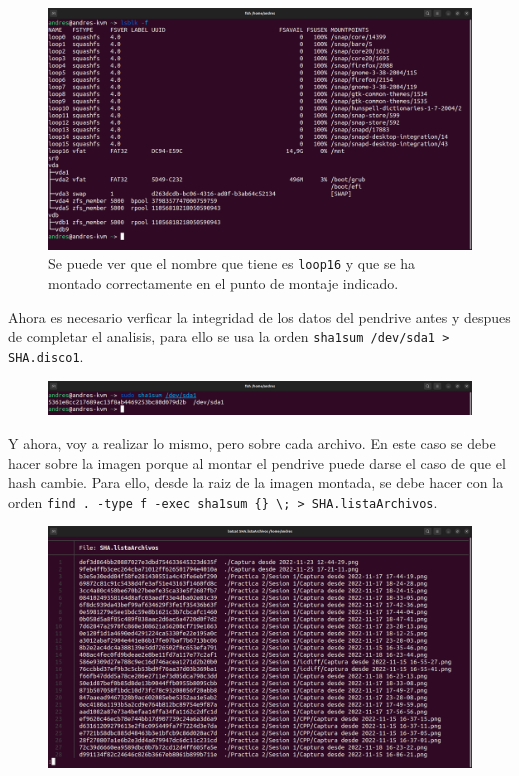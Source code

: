 \documentclass{article}
\begin{document}
\begin{figure}[H]
    \centering
    \includegraphics[width=\textwidth]{imagenes/Captura desde 2022-12-03 21-32-34.png}
    \caption{Se puede ver que el nombre que tiene es \texttt{loop16} y que se ha montado correctamente en el punto de montaje indicado.}
\end{figure}

Ahora es necesario verficar la integridad de los datos del pendrive antes y despues de completar el analisis, para ello se usa la orden \verb|sha1sum /dev/sda1 > SHA.disco1|.

\begin{figure}[H]
    \centering
    \includegraphics[width=\textwidth]{imagenes/Captura desde 2022-12-03 21-36-15.png}
\end{figure}

Y ahora, voy a realizar lo mismo, pero sobre cada archivo. En este caso se debe hacer sobre la imagen porque al montar el pendrive puede darse el caso de que el hash cambie. Para ello, desde la raiz de la imagen montada, se debe hacer con la orden \verb|find . -type f -exec sha1sum {} \; > SHA.listaArchivos|.

\begin{figure}[H]
    \centering
    \includegraphics[width=\textwidth]{imagenes/Captura desde 2022-12-02 18-41-07.png}
\end{figure}
\end{document}

